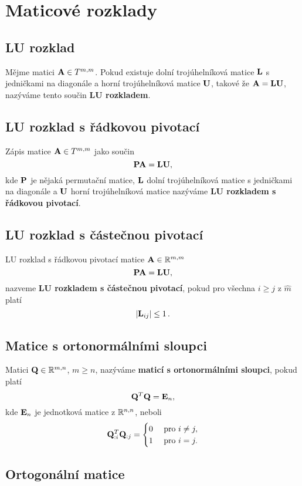 \section{Maticové rozklady}

\subsection*{LU rozklad}

Mějme matici $\mathbf{A}\in T^{m,m}$. Pokud existuje dolní trojúhelníková matice $\mathbf{L}$
s jedničkami na diagonále a horní trojúhelníková matice $\mathbf{U}$, takové že
$\mathbf{A}=\mathbf{L}\mathbf{U}$, nazýváme tento součin \textbf{LU rozkladem}.

\subsection*{LU rozklad s řádkovou pivotací}

Zápis matice $\mathbf{A} \in T^{m,m}$ jako součin
\[ \mathbf{P}\mathbf{A} = \mathbf{L}\mathbf{U}, \]
kde $\mathbf{P}$ je nějaká permutační matice, $\mathbf{L}$ dolní trojúhelníková matice s
jedničkami na diagonále a $\mathbf{U}$ horní trojúhelníková matice nazýváme \textbf{LU
	rozkladem s řádkovou pivotací}.

\subsection*{LU rozklad s částečnou pivotací}

LU rozklad s řádkovou pivotací matice $\mathbf{A} \in \mathbb{R}^{m,m}$
\[ \mathbf{P}\mathbf{A} = \mathbf{L}\mathbf{U}, \]
nazveme \textbf{LU rozkladem s částečnou pivotací}, pokud pro všechna $i \geq
	j$ z $\hat m$ platí
\[ |\mathbf{L}_{ij}|\leq 1\,. \]

\subsection*{Matice s ortonormálními sloupci}

Matici $\mathbf{Q}\in\mathbb{R}^{m,n}$, $m \ge n$, nazýváme \textbf{maticí s ortonormálními
	sloupci}, pokud platí
\[ \mathbf{Q}^T\mathbf{Q} = \mathbf{E}_n, \]
kde $\mathbf{E}_n$ je jednotková matice z $\mathbb{R}^{n,n}$, neboli
\[ \mathbf{Q}_{:i}^T\mathbf{Q}_{:j} = \begin{cases} 0 & \text{ pro } i \neq j, \\ 1 & \text{ pro } i = j. \end{cases} \]

\subsection*{Ortogonální matice}

